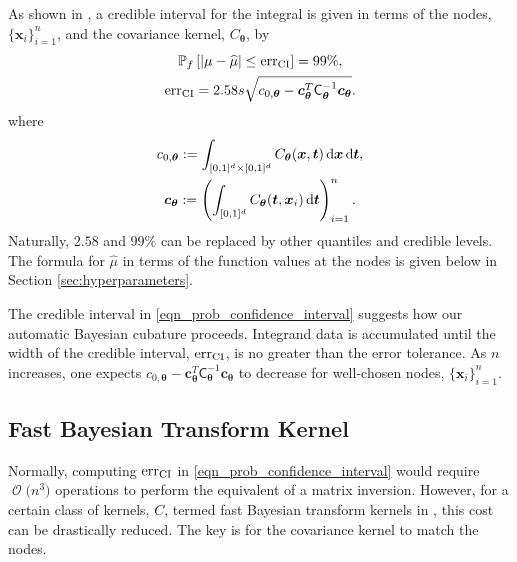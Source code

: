 \documentclass[graybox,footinfo]{svmult}
\DeclareMathOperator{\Order}{{\mathcal O}}
\newcommand{\bm}[1]{\boldsymbol{#1}}
\newcommand{\dif}[1]{\text{d}{#1}}
\newcommand{\vtheta}{{\bm{\theta}}}
\newcommand{\vc}{\bm{c}}
\newcommand{\vt}{\bm{t}}
\newcommand{\vx}{\bm{x}}
\newcommand{\mC}{\mathsf{C}}
\newcommand{\hmu}{\widehat{\mu}}
\newcommand{\CI}{\textup{CI}}
\newcommand{\err}{\textup{err}}
\begin{document}
As shown in \cite{RatHic19a}, a credible interval for the integral is given in terms of the nodes, $\{\vx_i\}_{i=1}^n$, and the covariance kernel, $C_\vtheta$,  by 
\begin{subequations} \label{eqn_prob_confidence_interval}
	\begin{gather}
	\mathbb{P}_f \left[
	|\mu-\hmu| \leq \err_{\CI}
	\right] = 99\%, \\
	\err_{\CI} = 2.58 s \sqrt{c_{0,\vtheta} - \vc_\vtheta^T\mC_\vtheta^{-1}\vc_\vtheta}.
	\end{gather}
\end{subequations}
where
\begin{subequations} \label{eqn:fGaussDist}
\begin{gather}
\label{eqn:fGaussDist_c0}
	c_{0,\vtheta} := \int_{[0,1]^{d} \times [0,1]^{d}} C_\vtheta(\vx,\vt) \, \dif{\vx} \, \dif{\vt}, \\
	\label{eqn:fGaussDist_vc}
 \vc_\vtheta := \left(  \int_{[0,1]^d} C_\vtheta(\vt,\vx_i) \, \D \vt \right)_{i=1}^n.
	\end{gather}
\end{subequations}
Naturally, $2.58$ and $99\%$ can be replaced by other quantiles and credible levels.  The formula for $\hmu$ in terms of the function values at the nodes is given below in Section \ref{sec:hyperparameters}.

The credible interval in \eqref{eqn_prob_confidence_interval} suggests how our automatic Bayesian cubature proceeds.  Integrand data is accumulated until the width of the credible interval, $\err_{\CI}$, is no greater than the error tolerance.  As $n$ increases, one expects $c_{0,\vtheta} - \vc_\vtheta^T\mC_\vtheta^{-1}\vc_\vtheta$ to decrease for well-chosen nodes, $\{\vx_i\}_{i=1}^n$. 



\subsection{Fast Bayesian Transform Kernel}
\label{sec:fast_BC}

Normally, computing $\err_{\CI}$ in  \eqref{eqn_prob_confidence_interval} would require $\Order\bigl( n^3 \bigr)$ operations to perform the equivalent of a matrix inversion.  However, for a certain class of kernels, $C$, termed fast Bayesian transform kernels in \cite{RatHic19a}, this cost can be drastically reduced.  The key is for the covariance kernel to match the nodes.
\end{document}
